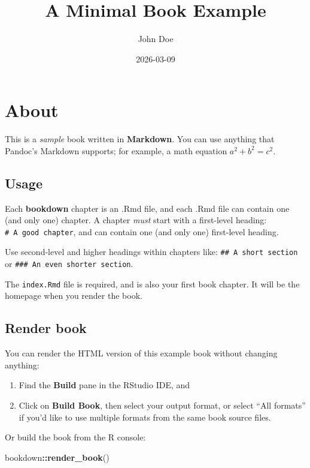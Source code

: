 \documentclass[
]{book}
\title{A Minimal Book Example}
\author{John Doe}
\date{2026-03-09}
\newenvironment{Shaded}{\begin{snugshade}}{\end{snugshade}}
\newcommand{\FunctionTok}[1]{\textcolor[rgb]{0.13,0.29,0.53}{\textbf{#1}}}
\newcommand{\NormalTok}[1]{#1}
\newcommand{\SpecialCharTok}[1]{\textcolor[rgb]{0.81,0.36,0.00}{\textbf{#1}}}
\theoremstyle{definition}
\theoremstyle{definition}
\theoremstyle{definition}
\theoremstyle{definition}
\theoremstyle{remark}
\begin{document}
\maketitle

{
\setcounter{tocdepth}{1}
\tableofcontents
}
\chapter{About}\label{about}

This is a \emph{sample} book written in \textbf{Markdown}. You can use anything that Pandoc's Markdown supports; for example, a math equation \(a^2 + b^2 = c^2\).

\section{Usage}\label{usage}

Each \textbf{bookdown} chapter is an .Rmd file, and each .Rmd file can contain one (and only one) chapter. A chapter \emph{must} start with a first-level heading: \texttt{\#\ A\ good\ chapter}, and can contain one (and only one) first-level heading.

Use second-level and higher headings within chapters like: \texttt{\#\#\ A\ short\ section} or \texttt{\#\#\#\ An\ even\ shorter\ section}.

The \texttt{index.Rmd} file is required, and is also your first book chapter. It will be the homepage when you render the book.

\section{Render book}\label{render-book}

You can render the HTML version of this example book without changing anything:

\begin{enumerate}
\def\labelenumi{\arabic{enumi}.}
\item
  Find the \textbf{Build} pane in the RStudio IDE, and
\item
  Click on \textbf{Build Book}, then select your output format, or select ``All formats'' if you'd like to use multiple formats from the same book source files.
\end{enumerate}

Or build the book from the R console:

\begin{Shaded}
\begin{Highlighting}[]
\NormalTok{bookdown}\SpecialCharTok{::}\FunctionTok{render\_book}\NormalTok{()}
\end{Highlighting}
\end{Shaded}
\end{document}
